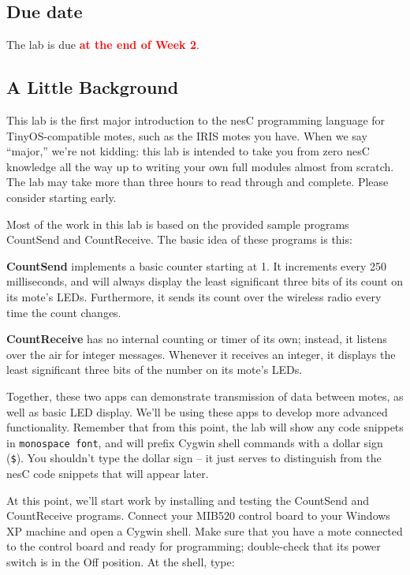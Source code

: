 \documentclass{article}
\newcommand{\labduedate}{at the end of Week 2}
\begin{document}
\subsection*{Due date}
The lab is due \textcolor{red}{\textbf{\labduedate}}.



\subsection*{A Little Background}

This lab is the first major introduction to the nesC programming language for TinyOS-compatible motes, such as the IRIS motes you have. When we say ``major,'' we're not kidding: this lab is intended to take you from zero nesC knowledge all the way up to writing your own full modules almost from scratch. The lab may take more than three hours to read through and complete. Please consider starting early.

Most of the work in this lab is based on the provided sample programs CountSend and CountReceive. The basic idea of these programs is this:

\begin{itemize*}
\item \textbf{CountSend} implements a basic counter starting at 1. It increments every 250 milliseconds, and will always display the least significant three bits of its count on its mote's LEDs. Furthermore, it sends its count over the wireless radio every time the count changes.
\item \textbf{CountReceive} has no internal counting or timer of its own; instead, it listens over the air for integer messages. Whenever it receives an integer, it displays the least significant three bits of the number on its mote's LEDs.
\end{itemize*}

Together, these two apps can demonstrate transmission of data between motes, as well as basic LED display. We'll be using these apps to develop more advanced functionality. Remember that from this point, the lab will show any code snippets in \verb!monospace font!, and will prefix Cygwin shell commands with a dollar sign (\verb!$!). You shouldn't type the dollar sign -- it just serves to distinguish from the nesC code snippets that will appear later.


At this point, we'll start work by installing and testing the CountSend and CountReceive programs. Connect your MIB520 control board to your Windows XP machine and open a Cygwin shell. Make sure that you have a mote connected to the control board and ready for programming; double-check that its power switch is in the Off position. At the shell, type:
\end{document}
